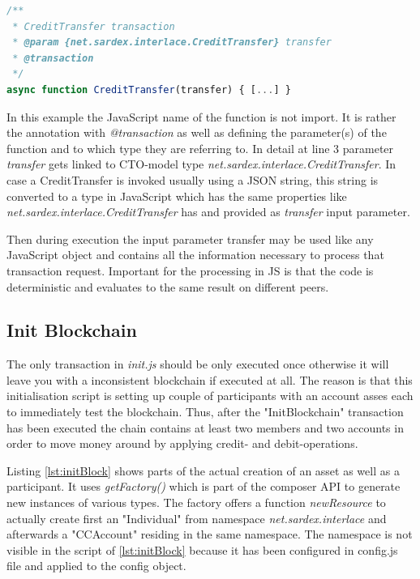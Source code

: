 \begin{center}
\begin{minipage}{0.8\textwidth}
\small
\begin{lstlisting}[language=javascript,firstnumber=1,caption={\bf\small Connection of JavaScript function CreditTransfer to CTO-model transaction type}, captionpos=b,label=lst:linkTransaction]
/**
 * CreditTransfer transaction
 * @param {net.sardex.interlace.CreditTransfer} transfer
 * @transaction
 */
async function CreditTransfer(transfer) { [...] }
\end{lstlisting}
\end{minipage}
\end{center}

In this example the JavaScript name of the function is not import. It is rather the annotation with \textit{@transaction} as well as defining the parameter(s) of the function and to which type they are referring to. In detail at line 3 parameter \textit{transfer} gets linked to CTO-model type \textit{net.sardex.interlace.CreditTransfer}. In case a CreditTransfer is invoked usually using a JSON string, this string is converted to a type in JavaScript which has the same properties like \textit{net.sardex.interlace.CreditTransfer} has and provided as \textit{transfer} input parameter.

Then during execution the input parameter transfer may be used like any JavaScript object and contains all the information necessary to process that transaction request. Important for the processing in JS is that the code is deterministic and evaluates to the same result on different peers.

\subsection{Init Blockchain}

The only transaction in \textit{init.js} should be only executed once otherwise it will leave you with a inconsistent blockchain if executed at all. The reason is that this initialisation script is setting up couple of participants with an account asses each to immediately test the blockchain. Thus, after the "InitBlockchain" transaction has been executed the chain contains at least two members and two accounts in order to move money around by applying credit- and debit-operations.

Listing \ref{lst:initBlock} shows parts of the actual creation of an asset as well as a participant. It uses \textit{getFactory()} which is part of the composer API to generate new instances of various types. The factory offers a function \textit{newResource} to actually create first an "Individual" from namespace \textit{net.sardex.interlace} and afterwards a "CCAccount" residing in the same namespace. The namespace is not visible in the script of \ref{lst:initBlock} because it has been configured in config.js file and applied to the config object.

